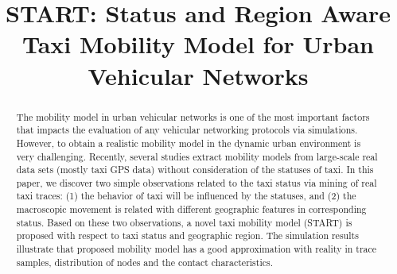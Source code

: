 \documentclass[10pt,conference,compsocconf,letterpaper]{IEEEtran}
\begin{document}
\title{START: Status and Region Aware Taxi Mobility Model for Urban Vehicular Networks}

\author{
}
\maketitle

\begin{abstract}
The mobility model in urban vehicular networks is one of the most important factors that impacts the evaluation of any vehicular networking protocols via simulations. However, to obtain a realistic mobility model in the dynamic urban environment is very challenging. Recently, several studies extract mobility models from large-scale real data sets (mostly taxi GPS data) without consideration of the statuses of taxi. In this paper, we discover two simple observations related to the taxi status via mining of real taxi traces: (1) the behavior of taxi will be influenced by the statuses, and (2) the macroscopic movement is related with different geographic features in corresponding status. Based on these two observations, a novel taxi mobility model (START) is proposed with respect to taxi status and geographic region. The simulation results illustrate that proposed mobility model has a good approximation with reality in trace samples, distribution of nodes and the contact characteristics.
\end{abstract}
\end{document}
